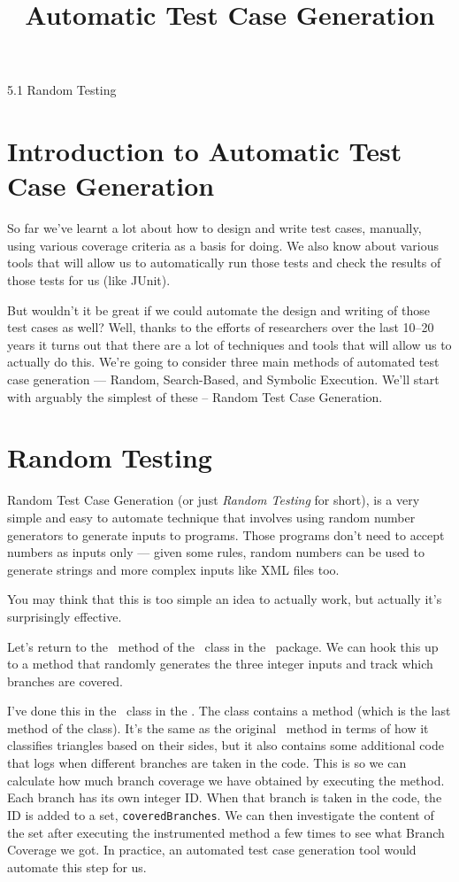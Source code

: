 



\title{Automatic Test Case Generation}{5.1 Random Testing}

\section{Introduction to Automatic Test Case Generation}

So far we've learnt a lot about how to design and write test cases, manually, using
various coverage criteria as a basis for doing. We also know about various tools
that will allow us to automatically run those tests and check the results of
those tests for us (like JUnit). 

But wouldn't it be great if we could automate the design and writing of those
test cases as well? Well, thanks to the efforts of researchers over the last
10--20 years it turns out that there are a lot of techniques and tools that will
allow us to actually do this. We're going to consider three main methods of
automated test case generation --- Random, Search-Based, and Symbolic Execution.
We'll start with arguably the simplest of these -- Random Test Case Generation.


\section{Random Testing}

Random Test Case Generation (or just {\it Random Testing} for short), is a very
simple and easy to automate technique that involves using random number
generators to generate inputs to programs. Those programs don't need to accept
numbers as inputs only --- given some rules, random numbers can be used to
generate strings and more complex inputs like XML files too.

You may think that this is too simple an idea to actually work, but actually
it's surprisingly effective. 


Let's return to the \classifymethod~method of the \triangleclass~class in the
\lecturespackage~package. We can hook this up to a method that randomly
generates the three integer inputs and track which branches are covered. 

I've done this in the \randomlytesttriangleclass~class in the
\lecturesexecutionpackage. The class contains a method
\instrumentedclassifymethod (which is the last method of the class). It's the
same as the original \classifymethod~method in terms of how it classifies
triangles based on their sides, but it also contains some additional code that
logs when different branches are taken in the code. This is so we can calculate
how much branch coverage we have obtained by executing the method. Each branch
has its own integer ID. When that branch is taken in the code, the ID is added
to a set, {\tt coveredBranches}. We can then investigate the content of the set
after executing the instrumented method a few times to see what Branch Coverage
we got. In practice, an automated test case generation tool would automate this
step for us.

